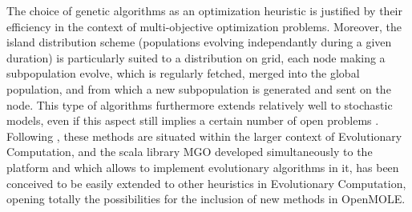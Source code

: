 \documentclass[10pt]{article}
\begin{document}
The choice of genetic algorithms as an optimization heuristic is justified by their efficiency in the context of multi-objective optimization problems. Moreover, the island distribution scheme (populations evolving independantly during a given duration) is particularly suited to a distribution on grid, each node making a subpopulation evolve, which is regularly fetched, merged into the global population, and from which a new subpopulation is generated and sent on the node. This type of algorithms furthermore extends relatively well to stochastic models, even if this aspect still implies a certain number of open problems \citep{rakshit2017noisy}. Following \cite{rey2015plateforme}, these methods are situated within the larger context of Evolutionary Computation, and the scala library MGO developed simultaneously to the platform and which allows to implement evolutionary algorithms in it, has been conceived to be easily extended to other heuristics in Evolutionary Computation, opening totally the possibilities for the inclusion of new methods in OpenMOLE.
\end{document}
